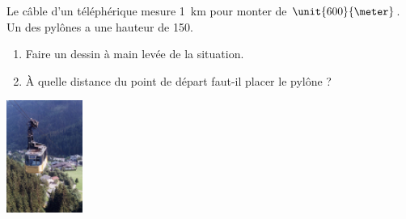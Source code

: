 
\begin{exercice}\label{exo2smath-0152}

    \begin{multicols}{2}
    Le câble d'un téléphérique mesure \SI{1}{\kilo\meter}  pour monter de \( \unit{600}{\meter}\). Un des pylônes a une hauteur de \unit{150}{\meter}.
    \begin{enumerate}
        \item
            Faire un dessin à main levée de la situation.
        \item
    À quelle distance du point de départ faut-il placer le pylône ?
    \end{enumerate}

    \columnbreak
    \includegraphics[width=2.5cm]{telepherique.pdf}
    \end{multicols}

\end{exercice}
